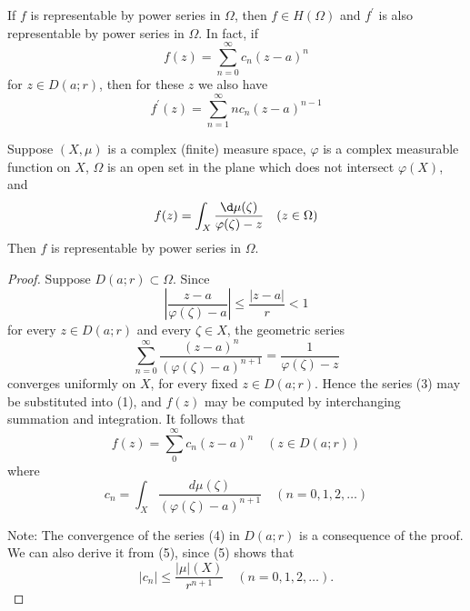 \documentclass[12pt, oneside]{book}
\begin{document}
\begin{theorem}
    If $f$ is representable by power series in $\Omega$, then $f \in H(\Omega)$ and $f^{\prime}$ is also representable by power series in $\Omega$. In fact, if
    \begin{equation*}
        f(z)=\sum_{n=0}^{\infty} c_n(z-a)^n
    \end{equation*}
    for $z \in D(a ; r)$, then for these $z$ we also have
    \begin{equation*}
        f^{\prime}(z)=\sum_{n=1}^{\infty} n c_n(z-a)^{n-1}
    \end{equation*}
\end{theorem}

\begin{theorem}
    Suppose $\left(X,\mu\right)$ is a complex (finite) measure space, $\varphi$ is a complex measurable function on $X$, $\Omega$ is an open set in the plane which does not intersect $\varphi(X)$, and
    \begin{equation*}
        f(z)
        =
        \int_X \frac{\d \mu(\zeta)}{\varphi(\zeta)-z} \quad(z \in \Omega)
    \end{equation*}
    Then $f$ is representable by power series in $\Omega$.
    \begin{proof}
        Suppose $D(a ; r) \subset \Omega$. Since
        \begin{equation*}
            \left|\frac{z-a}{\varphi(\zeta)-a}\right| \leq \frac{|z-a|}{r}<1
        \end{equation*}
        for every $z \in D(a ; r)$ and every $\zeta \in X$, the geometric series
        \begin{equation*}
            \sum_{n=0}^{\infty} \frac{(z-a)^n}{(\varphi(\zeta)-a)^{n+1}}=\frac{1}{\varphi(\zeta)-z}
        \end{equation*}
        converges uniformly on $X$, for every fixed $z \in D(a ; r)$. Hence the series (3) may be substituted into (1), and $f(z)$ may be computed by interchanging summation and integration. It follows that
        \begin{equation*}
            f(z)=\sum_0^{\infty} c_n(z-a)^n \quad(z \in D(a ; r))
        \end{equation*}
        where
        \begin{equation*}
            c_n=\int_X \frac{d \mu(\zeta)}{(\varphi(\zeta)-a)^{n+1}} \quad(n=0,1,2, \ldots)
        \end{equation*}

        Note: The convergence of the series (4) in $D(a ; r)$ is a consequence of the proof. We can also derive it from (5), since (5) shows that
        \begin{equation*}
            \left|c_n\right| \leq \frac{|\mu|(X)}{r^{n+1}} \quad(n=0,1,2, \ldots) .
        \end{equation*}
    \end{proof}
\end{theorem}
\end{document}
